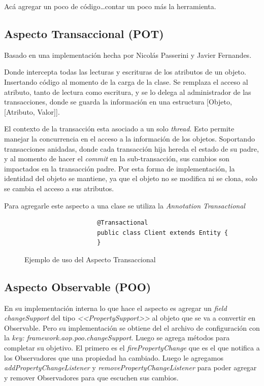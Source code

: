 	Acá agregar un poco de código\ldots contar un poco más la herramienta.


	\subsection{Aspecto Transaccional (POT)} 
		Basado en una implementación
		hecha por Nicolás Passerini y Javier Fernandes.
		 
		Donde intercepta todas las lecturas	y escrituras de los atributos de un
		objeto.	Insertando código al momento de la carga de la clase.
		Se remplaza el acceso al atributo, tanto de lectura como escritura, y se lo
		delega al administrador de las transacciones, donde se guarda la información
		en una estructura [Objeto, [Atributo, Valor]].
		
		\medskip
		
		El contexto de la transacción esta asociado a un solo \emph{thread}. Esto
		permite manejar la concurrencia en el acceso a la información de los objetos. 
		Soportando transacciones anidadas, donde cada transacción hija hereda el estado
		de su padre, y al momento de hacer el \emph{commit} en la sub-transacción, sus
		cambios son impactados en la transacción padre.
		Por esta forma de implementación, la identidad del objeto se mantiene, ya que
		el objeto no se modifica ni se clona, solo se cambia el acceso a sus
		atributos.
		
		Para agregarle este aspecto a una clase se utiliza la \emph{Annotation}
		\emph{Transactional }
				
		\begin{figure}[h]
				\begin{lstlisting} 
					@Transactional
					public class Client extends Entity {
					}
				\end{lstlisting}
			\caption{Ejemplo de uso del Aspecto Transaccional}
			\label{pot}
		\end{figure}  

	\subsection{ Aspecto Observable (POO)}
			
		En su implementación interna lo que hace el aspecto es agregar un \emph{field
		changeSupport} del tipo \emph{<<PropertySupport>>} al objeto que se va a
		convertir en Observable. Pero su implementación se obtiene del el archivo de
		configuración con la \emph{key: framework.aop.poo.changeSupport}.
		Luego se agrega métodos para completar su objetivo.
		El primero es el \emph{firePropertyChange} que es el que notifica a los
		Observadores que una propiedad ha cambiado.	Luego le agregamos
		\emph{addPropertyChangeListener} y \emph{removePropertyChangeListener} para
		poder agregar y remover Observadores para que escuchen sus cambios.
		
